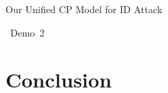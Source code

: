 \documentclass[table,aspectratio=169]{beamer}
\begin{document}
\begin{frame}{Our Unified CP Model for ID Attack}
\begin{figure}
  \centering
\end{figure}
\end{frame}

\begin{frame}
\begin{center}
\vspace{2.5cm}
{\huge \faLaptop~Demo~2}
\end{center}
\end{frame}

\section{Conclusion}
\end{document}
